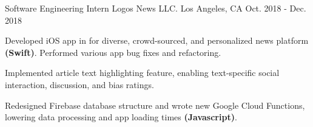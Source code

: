 \cventry
    {Software Engineering Intern} %
    {Logos News LLC.} %
    {Los Angeles, CA} %
    {Oct. 2018 - Dec. 2018} %
    {
      \begin{cvitems} %
        \item {Developed iOS app in for diverse, crowd-sourced, and personalized news platform \textbf{(Swift)}. Performed various app bug fixes and refactoring.
        \item Implemented article text highlighting feature, enabling text-specific social interaction, discussion, and bias ratings.}
        \item Redesigned Firebase database structure and wrote new Google Cloud Functions, lowering data processing and app loading times \textbf{(Javascript)}.
      \end{cvitems}
    }